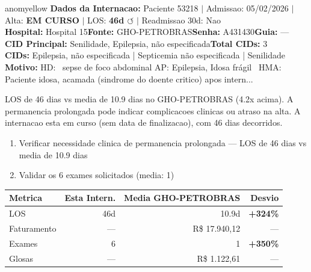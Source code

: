 \documentclass[a4paper,10pt]{article}
\begin{document}
\begin{anomalycard}[Internacao 164536 | GHO-PETROBRAS | MODERADO (z=2.62)]{anomyellow}
\textbf{Dados da Internacao:} Paciente 53218 $\mid$ Admissao: 05/02/2026 $\mid$ Alta: \textcolor{anomorange}{\textbf{EM CURSO}} $\mid$ LOS: \textbf{46d \textcolor{anomorange}{$\circlearrowleft$}} $\mid$ Readmissao 30d: Nao\\
\textbf{Hospital:} Hospital 15\quad\textbf{Fonte:} GHO-PETROBRAS\quad\textbf{Senha:} A431430\quad\textbf{Guia:} ---\\
\textbf{CID Principal:} {\small Senilidade, Epilepsia, não especificada}\quad\textbf{Total CIDs:} 3\\

\textbf{CIDs:} {\scriptsize Epilepsia, não especificada | Septicemia não especificada | Senilidade}\\

\textbf{Motivo:} {\scriptsize HD:  sepse de foco abdominal  AP: Epilepsia, Idosa frágil  HMA: Paciente idosa, acamada (sindrome do doente critico) apos intern...}\\

\vspace{2pt}\begin{tcolorbox}[colback=severityred!20,colframe=anomyellow,title={\textbf{Interpretacao de Negocio}},fonttitle=\bfseries\small,left=4pt,right=4pt,top=3pt,bottom=3pt]
{\small LOS de 46 dias vs media de 10.9 dias no GHO-PETROBRAS (4.2x acima). A permanencia prolongada pode indicar complicacoes clinicas ou atraso na alta. A internacao esta em curso (sem data de finalizacao), com 46 dias decorridos.}
\end{tcolorbox}
\begin{tcolorbox}[colback=severityyellow!30,colframe=anomorange,title={\textbf{Recomendacoes Especificas}},fonttitle=\bfseries\small,left=4pt,right=4pt,top=3pt,bottom=3pt]
\begin{enumerate}[nosep,leftmargin=16pt]
\item {\small Verificar necessidade clinica de permanencia prolongada --- LOS de 46 dias vs media de 10.9 dias}
\item {\small Validar os 6 exames solicitados (media: 1)}
\end{enumerate}
\end{tcolorbox}
\begin{center}\begin{tabular}{l r r r}\toprule\textbf{Metrica} & \textbf{Esta Intern.} & \textbf{Media GHO-PETROBRAS} & \textbf{Desvio} \\\midrule
LOS & 46d & 10.9d & \textcolor{anomred}{\textbf{+324\%}} \\
Faturamento & --- & R\$ 17.940,12 & --- \\
Exames & 6 & 1 & \textcolor{anomred}{\textbf{+350\%}} \\
Glosas & --- & R\$ 1.122,61 & --- \\
\bottomrule\end{tabular}\end{center}


\end{anomalycard}
\end{document}
